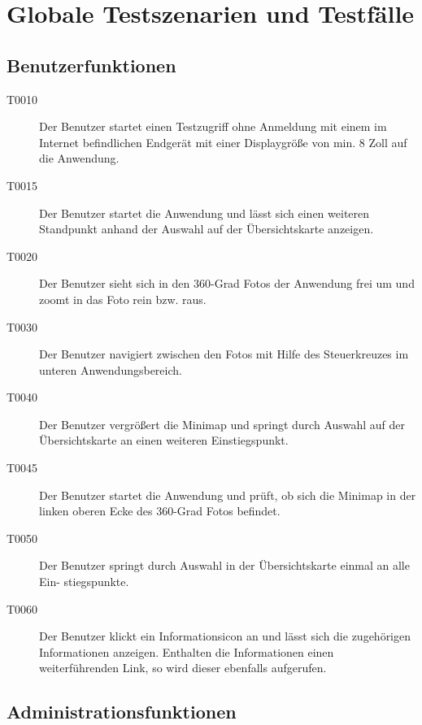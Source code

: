 \section{Globale Testszenarien und Testfälle}
\label{sec:GlobaleTestszenarienundTestfaelle}


\subsection{Benutzerfunktionen}
\label{sec:Benutzerfunktionen}

\begin{description}
  \item[T0010] Der Benutzer startet einen Testzugriff ohne Anmeldung mit einem im Internet befindlichen Endgerät mit einer Displaygröße von min. 8 Zoll auf die Anwendung.
  \item[T0015] Der Benutzer startet die Anwendung und lässt sich einen weiteren Standpunkt anhand der Auswahl auf der Übersichtskarte anzeigen.
  \item[T0020] Der Benutzer sieht sich in den 360-Grad Fotos der Anwendung frei um und zoomt in das Foto rein bzw. raus.
  \item[T0030] Der Benutzer navigiert zwischen den Fotos mit Hilfe des Steuerkreuzes im unteren Anwendungsbereich.
  \item[T0040] Der Benutzer vergrößert die Minimap und springt durch Auswahl auf der Übersichtskarte an einen weiteren Einstiegspunkt.
  \item[T0045] Der Benutzer startet die Anwendung und prüft, ob sich die Minimap in der linken
oberen Ecke des 360-Grad Fotos befindet.
  \item[T0050] Der Benutzer springt durch Auswahl in der Übersichtskarte einmal an alle Ein-
stiegspunkte.
  \item[T0060] Der Benutzer klickt ein Informationsicon an und lässt sich die zugehörigen Informationen anzeigen. Enthalten die Informationen einen weiterführenden Link, so wird dieser ebenfalls aufgerufen.
\end{description}

\subsection{Administrationsfunktionen}
\label{sec:Administrationsfunktionen}

